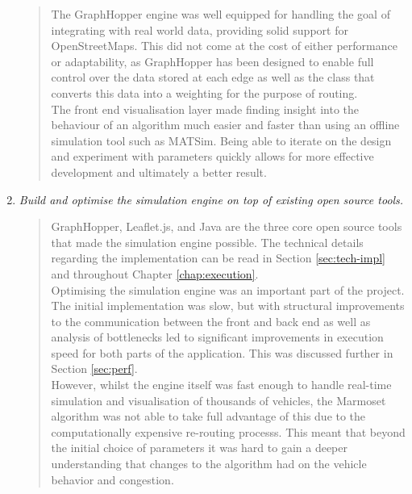 \documentclass[ %
                    author={Alexander Hill},
                supervisor={Dr. Benjamin Sach},
                    degree={MEng},
                     title={MARMOSET},
                  subtitle={Multi-Agent Route Management using Online Simulation for Efficient Transportation},
                      type={research},
                      year={2016} ]{dissertation}
\begin{document}
\begin{enumerate}
\begin{quote}
        The GraphHopper engine was well equipped for handling the goal of
        integrating with real world data, providing solid support for
        OpenStreetMaps. This did not come at the cost of either performance or
        adaptability, as GraphHopper has been designed to enable full control
        over the data stored at each edge as well as the class that converts
        this data into a weighting for the purpose of routing. \\

        The front end visualisation layer made finding insight into the
        behaviour of an algorithm much easier and faster than using an offline
        simulation tool such as MATSim. Being able to iterate on the design and
        experiment with parameters quickly allows for more effective development
        and ultimately a better result.
    \end{quote}

    \item \textit{Build and optimise the simulation engine on top of existing open
        source tools.}
    \begin{quote}
        GraphHopper, Leaflet.js, and Java are the three core open source tools
        that made the simulation engine possible. The technical details
        regarding the implementation can be read in Section \ref{sec:tech-impl}
        and throughout Chapter \ref{chap:execution}. \\

        Optimising the simulation engine was an important part of the project.
        The initial implementation was slow, but with structural improvements to
        the communication between the front and back end as well as analysis of
        bottlenecks led to significant improvements in execution speed for both
        parts of the application. This was discussed further in Section
        \ref{sec:perf}. \\

        However, whilst the engine itself was fast enough to handle real-time
        simulation and visualisation of thousands of vehicles, the Marmoset
        algorithm was not able to take full advantage of this due to the
        computationally expensive re-routing processs. This meant that beyond
        the initial choice of parameters it was hard to gain a deeper
        understanding that changes to the algorithm had on the vehicle behavior
        and congestion.
    \end{quote}


\end{enumerate}
\end{document}

